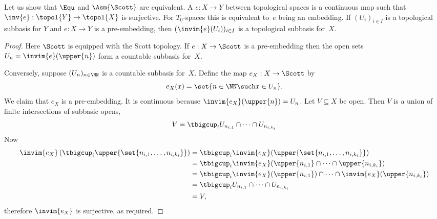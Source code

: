 Let us show that $\Equ$ and $\Asm{\Scott}$ are equivalent. A
 $e : X \to Y$ between topological spaces is a
continuous map such that $\inv{e} : \topol{Y} \to \topol{X}$ is
surjective. For $T_0$-spaces this is equivalent to~$e$ being an
embedding. If $(U_i)_{i \in I}$ is a topological subbasis for $Y$ and
$e : X \to Y$ is a pre-embedding, then $(\invim{e}(U_i))_{i \in I}$ is
a topological subbasis for~$X$.


\begin{proof}
  Here $\Scott$ is equipped with the Scott topology. If $e : X \to
  \Scott$ is a pre-embedding then the open sets $U_n =
  \invim{e}(\upper{n})$ form a countable subbasis for~$X$.

  Conversely, suppose $(U_n)_{n \in \NN}$ is a countable subbasis
  for~$X$. Define the map $e_X : X \to \Scott$ by
  \begin{equation*}
    e_X(x) = \set{n \in \NN \such x \in U_n}.
  \end{equation*}
  We claim that $e_X$ is a pre-embedding. It is continuous because
  $\invim{e_X}(\upper{n}) = U_n$. Let $V \subseteq X$ be open. Then 
  $V$ is a union of finite intersections of subbasic opens,
  \begin{equation*}
    V = \tbigcup_i U_{n_{i,1}} \cap \cdots \cap U_{n_{i,k_i}}
  \end{equation*}
  Now
  \begin{align*}
    \invim{e_X}\left(\tbigcup_i \upper{\set{n_{i,1}, \ldots, n_{i,k_i}}}\right) &=
      \tbigcup_i \invim{e_X}(\upper{\set{n_{i,1}, \ldots, n_{i,k_i}}})
      \\
      &=
      \tbigcup_i \invim{e_X}(\upper{n_{i,1}} \cap \cdots \cap \upper{n_{i,k_i}})
      \\
      &=
      \tbigcup_i \invim{e_X}(\upper{n_{i,1}}) \cap \cdots \cap \invim{e_X}(\upper{n_{i,k_i}})
      \\
      &=
      \tbigcup_i U_{n_{i,1}} \cap \cdots \cap U_{n_{i,k_i}} \\
      &= V,
  \end{align*}
  therefore $\invim{e_X}$ is surjective, as required.
\end{proof}

